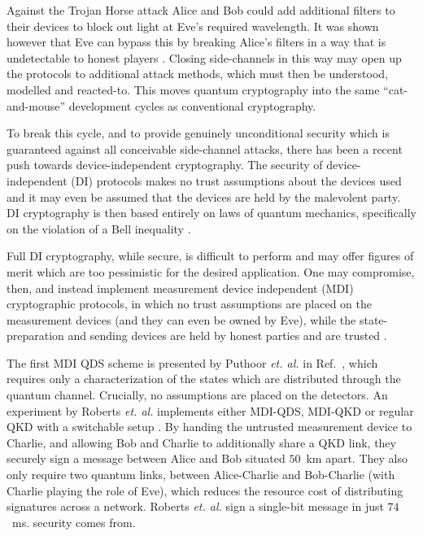 Against the Trojan Horse attack Alice and Bob could add additional filters to their devices to block out light at Eve's required wavelength. It was shown however that Eve can bypass this by breaking Alice's filters in a way that is undetectable to honest players \cite{Sajeed2016}. Closing side-channels in this way may open up the protocols to additional attack methods, which must then be understood, modelled and reacted-to. This moves quantum cryptography into the same ``cat-and-mouse'' development cycles as conventional cryptography. 

To break this cycle, and to provide genuinely unconditional security which is guaranteed against all conceivable side-channel attacks, there has been a recent push towards device-independent cryptography. The security of device-independent (DI) protocols makes no trust assumptions about the devices used and it may even be assumed that the  devices are held by the malevolent party. DI cryptography is then based entirely on laws of quantum mechanics, specifically on the violation of a Bell inequality \cite{Vazirani2014, Pironio2009, Colbeck2009}. 

Full DI cryptography, while secure, is difficult to perform and may offer figures of merit which are too pessimistic for the desired application. One may compromise, then, and instead implement measurement device independent (MDI) cryptographic protocols, in which no trust assumptions are placed on the measurement devices (and they can even be owned by Eve), while the state-preparation and sending devices are held by honest parties and are trusted \cite{Lo2012}.

The first MDI QDS scheme is presented by Puthoor \emph{et. al.} in Ref.~\cite{Puthoor2016}, which requires only a characterization of the states which are distributed through the quantum channel. Crucially, no assumptions are placed on the detectors. An experiment by Roberts \emph{et. al.} implements either MDI-QDS, MDI-QKD or regular QKD with a switchable setup \cite{Roberts2017}. By handing the untrusted measurement device to Charlie, and allowing Bob and Charlie to additionally share a QKD link, they securely sign a message between Alice and Bob situated $50$~km apart. They also only require two quantum links, between Alice-Charlie and Bob-Charlie (with Charlie playing the role of Eve), which reduces the resource cost of distributing signatures across a network. Roberts \emph{et. al.} sign a single-bit message in just $74$~ms.  security comes from.





